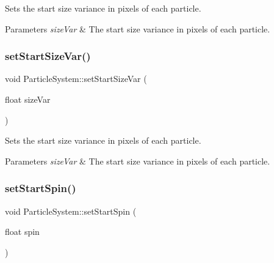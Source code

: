 Sets the start size variance in pixels of each particle.


\begin{DoxyParams}{Parameters}
{\em size\+Var} & The start size variance in pixels of each particle. \\
\hline
\end{DoxyParams}
\mbox{\label{classParticleSystem_a9f7ee2a4e5ae1f3b9b47a854a6e2fc2a}} 
\subsubsection{\texorpdfstring{set\+Start\+Size\+Var()}{setStartSizeVar()}\hspace{0.1cm}{\footnotesize\ttfamily [2/2]}}
{\footnotesize\ttfamily void Particle\+System\+::set\+Start\+Size\+Var (\begin{DoxyParamCaption}\item[{float}]{size\+Var }\end{DoxyParamCaption})\hspace{0.3cm}{\ttfamily [inline]}}

Sets the start size variance in pixels of each particle.


\begin{DoxyParams}{Parameters}
{\em size\+Var} & The start size variance in pixels of each particle. \\
\hline
\end{DoxyParams}
\mbox{\label{classParticleSystem_a2a6b02e437565c2dcc70d237c7c1c23a}} 
\subsubsection{\texorpdfstring{set\+Start\+Spin()}{setStartSpin()}\hspace{0.1cm}{\footnotesize\ttfamily [1/2]}}
{\footnotesize\ttfamily void Particle\+System\+::set\+Start\+Spin (\begin{DoxyParamCaption}\item[{float}]{spin }\end{DoxyParamCaption})\hspace{0.3cm}{\ttfamily [inline]}}

